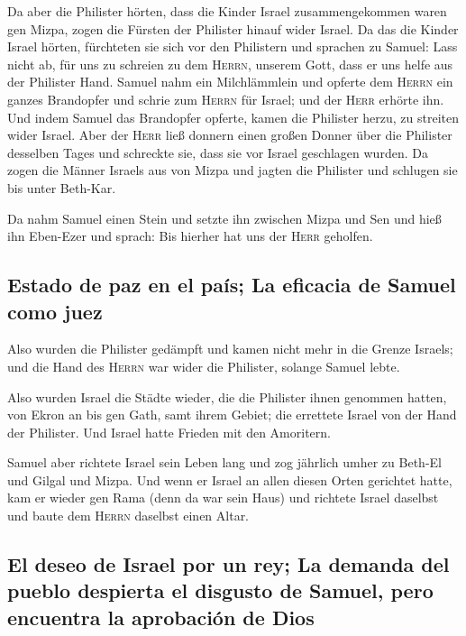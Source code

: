  Da aber die Philister hörten, dass die Kinder Israel
zusammengekommen waren gen Mizpa, zogen die Fürsten der Philister hinauf
wider Israel. Da das die Kinder Israel hörten, fürchteten sie sich vor
den Philistern  und sprachen zu Samuel: Lass nicht ab, für
uns zu schreien zu dem \textsc{Herrn}, unserem Gott, dass er uns helfe
aus der Philister Hand.  Samuel nahm ein Milchlämmlein und
opferte dem \textsc{Herrn} ein ganzes Brandopfer und schrie zum
\textsc{Herrn} für Israel; und der \textsc{Herr} erhörte ihn.
 Und indem Samuel das Brandopfer opferte, kamen die
Philister herzu, zu streiten wider Israel. Aber der \textsc{Herr} ließ
donnern einen großen Donner über die Philister desselben Tages und
schreckte sie, dass sie vor Israel geschlagen wurden.  Da
zogen die Männer Israels aus von Mizpa und jagten die Philister und
schlugen sie bis unter Beth-Kar.

 Da nahm Samuel einen Stein und setzte ihn zwischen Mizpa
und Sen und hieß ihn Eben-Ezer und sprach: Bis hierher hat uns der
\textsc{Herr} geholfen.

\hypertarget{estado-de-paz-en-el-pauxeds-la-eficacia-de-samuel-como-juez}{%
\subsection{Estado de paz en el país; La eficacia de Samuel como
juez}\label{estado-de-paz-en-el-pauxeds-la-eficacia-de-samuel-como-juez}}

 Also wurden die Philister gedämpft und kamen nicht mehr
in die Grenze Israels; und die Hand des \textsc{Herrn} war wider die
Philister, solange Samuel lebte.

 Also wurden Israel die Städte wieder, die die Philister
ihnen genommen hatten, von Ekron an bis gen Gath, samt ihrem Gebiet; die
errettete Israel von der Hand der Philister. Und Israel hatte Frieden
mit den Amoritern.

 Samuel aber richtete Israel sein Leben lang
 und zog jährlich umher zu Beth-El und Gilgal und Mizpa.
Und wenn er Israel an allen diesen Orten gerichtet hatte,
 kam er wieder gen Rama (denn da war sein Haus) und
richtete Israel daselbst und baute dem \textsc{Herrn} daselbst einen
Altar.

\hypertarget{el-deseo-de-israel-por-un-rey-la-demanda-del-pueblo-despierta-el-disgusto-de-samuel-pero-encuentra-la-aprobaciuxf3n-de-dios}{%
\subsection{El deseo de Israel por un rey; La demanda del pueblo
despierta el disgusto de Samuel, pero encuentra la aprobación de
Dios}\label{el-deseo-de-israel-por-un-rey-la-demanda-del-pueblo-despierta-el-disgusto-de-samuel-pero-encuentra-la-aprobaciuxf3n-de-dios}}

